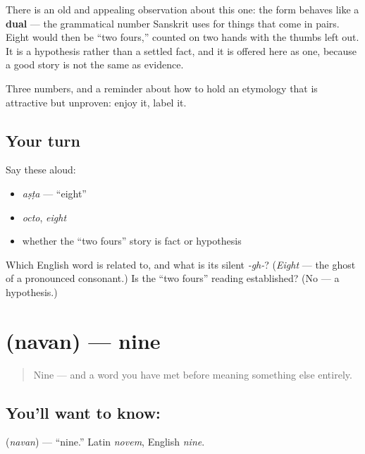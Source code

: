 There is an old and appealing observation about this one: the form behaves like a \textbf{dual} — the grammatical number Sanskrit uses for things that come in pairs. Eight would then be \textquotedblleft{}two fours,\textquotedblright{} counted on two hands with the thumbs left out. It is a hypothesis rather than a settled fact, and it is offered here as one, because a good story is not the same as evidence.

\begin{grammarlens}[title={What you've built}]
Three numbers, and a reminder about how to hold an etymology that is attractive but unproven: enjoy it, label it.
\end{grammarlens}

\subsection*{Your turn}
Say these aloud:

\begin{itemize}
\raggedright
  \item \emph{aṣṭa} — \textquotedblleft{}eight\textquotedblright{}
  \item \emph{octo}, \emph{eight}
  \item whether the \textquotedblleft{}two fours\textquotedblright{} story is fact or hypothesis
\end{itemize}

\begin{tcolorbox}[breakable,colback=teal!4,colframe=teal!35!black,title={Before you move on}]
Which English word is  related to, and what is its silent \emph{-gh-}? (\emph{Eight} — the ghost of a pronounced consonant.) Is the \textquotedblleft{}two fours\textquotedblright{} reading established? (No — a hypothesis.)
\end{tcolorbox}
\section[\texorpdfstring{\sk{नवन्} (navan)}{नवन् (navan)}]{ (navan) — nine}

\label{lesson:SA-C19-nine}



\begin{quote}
Nine — and a word you have met before meaning something else entirely.
\end{quote}

\subsection*{You'll want to know: }
\textbf{} (\emph{navan}) — \textquotedblleft{}nine.\textquotedblright{} Latin \emph{novem}, English \emph{nine}.

